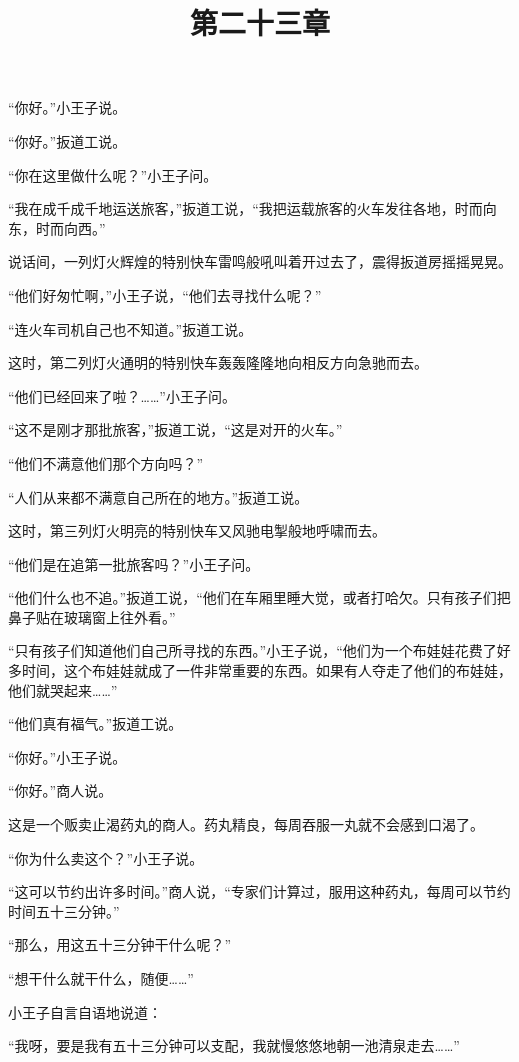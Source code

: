 “你好。”小王子说。

“你好。”扳道工说。

“你在这里做什么呢？”小王子问。

“我在成千成千地运送旅客，”扳道工说，“我把运载旅客的火车发往各地，时而向东，时而向西。”

说话间，一列灯火辉煌的特别快车雷鸣般吼叫着开过去了，震得扳道房摇摇晃晃。

“他们好匆忙啊，”小王子说，“他们去寻找什么呢？”

“连火车司机自己也不知道。”扳道工说。

这时，第二列灯火通明的特别快车轰轰隆隆地向相反方向急驰而去。

“他们已经回来了啦？\ldots{}\ldots{}”小王子问。

“这不是刚才那批旅客，”扳道工说，“这是对开的火车。”

“他们不满意他们那个方向吗？”

“人们从来都不满意自己所在的地方。”扳道工说。

这时，第三列灯火明亮的特别快车又风驰电掣般地呼啸而去。

“他们是在追第一批旅客吗？”小王子问。

“他们什么也不追。”扳道工说，“他们在车厢里睡大觉，或者打哈欠。只有孩子们把鼻子贴在玻璃窗上往外看。”

“只有孩子们知道他们自己所寻找的东西。”小王子说，“他们为一个布娃娃花费了好多时间，这个布娃娃就成了一件非常重要的东西。如果有人夺走了他们的布娃娃，他们就哭起来\ldots{}\ldots{}”

“他们真有福气。”扳道工说。

\title{第二十三章}

“你好。”小王子说。

“你好。”商人说。

这是一个贩卖止渴药丸的商人。药丸精良，每周吞服一丸就不会感到口渴了。

“你为什么卖这个？”小王子说。

“这可以节约出许多时间。”商人说，“专家们计算过，服用这种药丸，每周可以节约时间五十三分钟。”

“那么，用这五十三分钟干什么呢？”

“想干什么就干什么，随便\ldots{}\ldots{}”

小王子自言自语地说道：

“我呀，要是我有五十三分钟可以支配，我就慢悠悠地朝一池清泉走去\ldots{}\ldots{}”

{\startalignment[center]
 \stopalignment}

